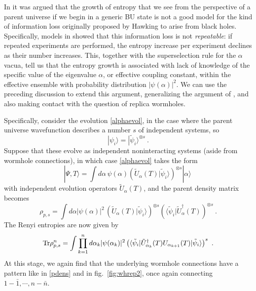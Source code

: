 \documentclass[12pt]{article}
\numberwithin{equation}{section}
\newcommand{\beq}{\begin{equation}}
\newcommand{\eeq}{\end{equation}}
\newcommand{\Tr}{{\rm Tr}}
\begin{document}
In \cite{Cole,GiStInc} it was argued that the growth of entropy that we see from the perspective of a parent universe if we begin in a generic BU state is not a good model for the kind of information loss originally proposed by Hawking to arise from black holes\cite{Hawking:1976ra}.   Specifically, models in \cite{Cole, GiStInc} showed that this information loss is not {\it repeatable}: if repeated experiments are performed, the entropy increase per experiment declines as their number increases.  This, together with the superselection rule for the $\alpha$ vacua, tell us that the entropy growth is associated with 
lack of knowledge of the specific value of the eigenvalue $\alpha$, or effective coupling constant, within the effective ensemble with probability distribution $|\psi(\alpha)|^2$.   We can use the preceding discussion to extend this argument, generalizing the argument  of \cite{Cole,GiStInc}, and also making contact with the question of replica wormholes.

Specifically, consider the evolution \eqref{alphaevol}, in the case where the parent universe wavefunction describes a number $s$ of independent systems, so
\beq
|\psi_i\rangle = |\tilde \psi_i\rangle^{\otimes s}\ .
\eeq
Suppose that these evolve as independent noninteracting systems (aside from wormhole connections), in which case  \eqref{alphaevol} takes the form
\beq
|\Psi, T\rangle = \int d\alpha\, \psi(\alpha) \left(\tilde U_\alpha(T) |\tilde \psi_i\rangle\right)^{\otimes s} |\alpha\rangle\ 
\eeq
with independent evolution operators $\tilde U_\alpha(T)$, and the parent density matrix becomes
\beq
\rho_{p,s}= \int d\alpha |\psi(\alpha)|^2\,  \left(\tilde U_\alpha(T) |\tilde \psi_i\rangle\right)^{\otimes s} \left(\langle \tilde \psi_i| \tilde U^\dagger_\alpha(T) \right)^{\otimes s}\ .
\eeq
The Renyi entropies are now given by
\beq\label{sReyn}
\Tr \rho_{p,s}^n = \int\prod_{k=1}^n  d\alpha_k | \psi(\alpha_k)|^2 \left( \langle \tilde \psi_i| \tilde U^\dagger_{\alpha_k}(T) U_{\alpha_{k+1}}(T) |\tilde \psi_i\rangle   \right)^s\ .
\eeq
At this stage, we again find that the underlying wormhole connections have a pattern like in \eqref{pdens} and in fig.~\ref{fig:whrep2}, once again connecting $1-{\bar 1},\cdots,n-{\bar n}$.
\end{document}
